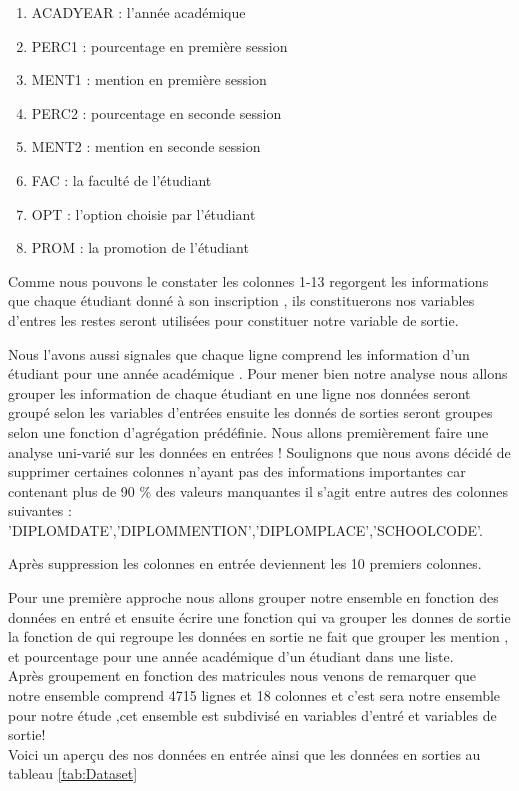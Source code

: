 \begin{multicols}{2}
\begin{enumerate}
	\item  ACADYEAR : l'année académique
	
	\item  PERC1 : pourcentage en première session
	
	\item  MENT1 : mention en première session
	
	\item  PERC2 : pourcentage en seconde session
	
	\item  MENT2 : mention en seconde session
	
	\item  FAC : la faculté de l'étudiant 
	
	\item  OPT : l'option choisie par l'étudiant
	
	\item  PROM : la promotion de l'étudiant 
	\end{enumerate}
\end{multicols}

 Comme nous pouvons le constater les colonnes 1-13 regorgent les informations que chaque étudiant donné à son inscription , ils constituerons nos variables d'entres les restes seront utilisées pour constituer notre variable de sortie.

Nous l'avons aussi signales que chaque ligne comprend les information
d'un étudiant pour une année académique . Pour mener bien notre analyse nous allons grouper les information de chaque étudiant en une ligne nos données seront groupé selon les variables d'entrées ensuite les donnés de sorties seront groupes selon une fonction d'agrégation prédéfinie.
Nous allons premièrement faire une analyse uni-varié  sur les données en entrées !
Soulignons que nous avons décidé de supprimer certaines colonnes n'ayant pas des informations importantes car contenant plus de 90 \% des valeurs manquantes il s'agit entre autres des colonnes suivantes :
'DIPLOMDATE','DIPLOMMENTION','DIPLOMPLACE','SCHOOLCODE'.

Après suppression les colonnes en entrée deviennent les 10 premiers colonnes.

Pour une première approche nous allons grouper notre ensemble en fonction des données en entré et ensuite écrire une fonction qui va grouper les donnes de sortie la fonction de qui regroupe les données en sortie ne fait que grouper les mention , et pourcentage pour une année académique d'un étudiant dans une liste.\\ 
Après groupement en fonction des matricules nous venons de remarquer que
notre ensemble comprend 4715 lignes et 18 colonnes et c'est sera notre ensemble pour notre étude ,cet ensemble est subdivisé en variables d'entré et variables de
sortie!\\
Voici un aperçu des nos données en entrée ainsi que les données en sorties  au tableau \ref{tab:Dataset}
